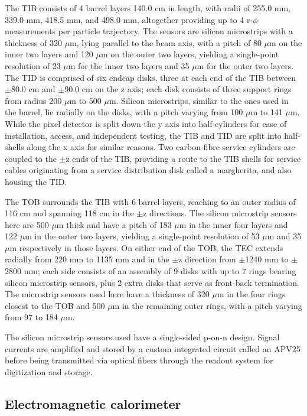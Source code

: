 The TIB consists of 4 barrel layers 140.0 cm in length, with radii of 255.0 mm, 339.0 mm, 418.5 mm, and 498.0 mm, altogether providing up to 4 r-$\phi$ measurements per particle trajectory. The sensors are silicon microstrips with a thickness of 320 $\mu$m, lying parallel to the beam axis, with a pitch of 80 $\mu$m on the inner two layers and 120 $\mu$m on the outer two layers, yielding a single-point resolution of 23 $\mu$m for the inner two layers and 35 $\mu$m for the outer two layers. The TID is comprised of six endcap disks, three at each end of the TIB between $\pm$80.0 cm and $\pm$90.0 cm on the z axis; each disk consists of three support rings from radius 200 $\mu$m to 500 $\mu$m. Silicon microstrips, similar to the ones used in the barrel, lie radially on the disks, with a pitch varying from 100 $\mu$m to 141 $\mu$m. While the pixel detector is split down the y axis into half-cylinders for ease of installation, access, and independent testing, the TIB and TID are split into half-shells along the x axis for similar reasons. Two carbon-fibre service cylinders are coupled to the $\pm$z ends of the TIB, providing a route to the TIB shells for service cables originating from a service distribution disk called a margherita, and also housing the TID.

The TOB surrounds the TIB with 6 barrel layers, reaching to an outer radius of 116 cm and spanning 118 cm in the $\pm$z directions. The silicon microstrip sensors here are 500 $\mu$m thick and have a pitch of 183 $\mu$m in the inner four layers and 122 $\mu$m in the outer two layers, yielding a single-point resolution of 53 $\mu$m and 35 $\mu$m respectively in those layers. On either end of the TOB, the TEC extends radially from 220 mm to 1135 mm and in the $\pm$z direction from $\pm$1240 mm to $\pm$2800 mm; each side consists of an assembly of 9 disks with up to 7 rings bearing silicon microstrip sensors, plus 2 extra disks that serve as front-back termination. The microstrip sensors used here have a thickness of 320 $\mu$m in the four rings closest to the TOB and 500 $\mu$m in the remaining outer rings, with a pitch varying from 97 to 184 $\mu$m.

The silicon microstrip sensors used have a single-sided p-on-n design. Signal currents are amplified and stored by a custom integrated circuit called an APV25 before being transmitted via optical fibers through the readout system for digitization and storage.

\subsection{Electromagnetic calorimeter\label{sec:cms-ecal}}

